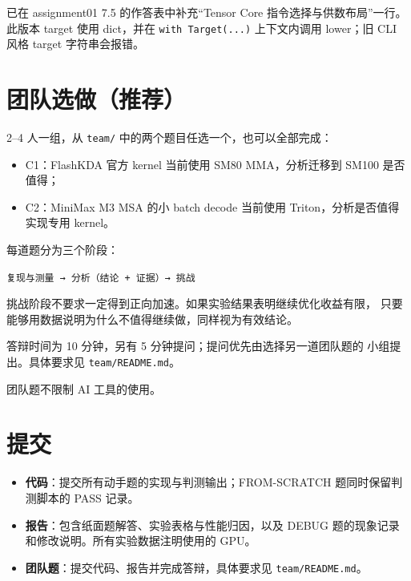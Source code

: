 \documentclass[11pt,a4paper,fontset=fandol]{ctexart}
\providecommand{\tightlist}{\setlength{\itemsep}{0pt}\setlength{\parskip}{0pt}}
\begin{document}
\begin{answer}
已在 assignment01 7.5 的作答表中补充``Tensor Core
指令选择与供数布局''一行。此版本 target 使用 dict，并在
\texttt{with\ Target(.\allowbreak{}.\allowbreak{}.\allowbreak{})}
上下文内调用 lower；旧 CLI 风格 target 字符串会报错。

\end{answer}

\section*{团队选做（推荐）}\label{ux56e2ux961fux9009ux505aux63a8ux8350}

2--4 人一组，从 \texttt{team/\allowbreak{}}
中的两个题目任选一个，也可以全部完成：

\begin{itemize}
\tightlist
\item
  C1：FlashKDA 官方 kernel 当前使用 SM80 MMA，分析迁移到 SM100
  是否值得；
\item
  C2：MiniMax M3 MSA 的小 batch decode 当前使用
  Triton，分析是否值得实现专用 kernel。
\end{itemize}

每道题分为三个阶段：

\texttt{复现与测量\ →\ 分析（结论\ +\ 证据）→\ 挑战}

挑战阶段不要求一定得到正向加速。如果实验结果表明继续优化收益有限，
只要能够用数据说明为什么不值得继续做，同样视为有效结论。

答辩时间为 10 分钟，另有 5 分钟提问；提问优先由选择另一道团队题的
小组提出。具体要求见 \texttt{team/\allowbreak{}README.\allowbreak{}md}。

团队题不限制 AI 工具的使用。

\section*{提交}\label{ux63d0ux4ea4}

\begin{itemize}
\tightlist
\item
  \textbf{代码}：提交所有动手题的实现与判测输出；FROM-SCRATCH
  题同时保留判测脚本的 PASS 记录。
\item
  \textbf{报告}：包含纸面题解答、实验表格与性能归因，以及 DEBUG
  题的现象记录和修改说明。所有实验数据注明使用的 GPU。
\item
  \textbf{团队题}：提交代码、报告并完成答辩，具体要求见
  \texttt{team/\allowbreak{}README.\allowbreak{}md}。
\end{itemize}
\end{document}
